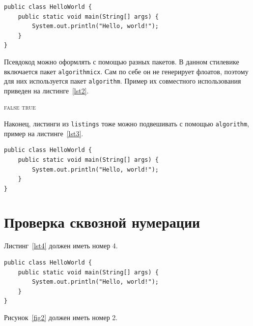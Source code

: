 \documentclass[specification,annotation,times]{itmo-student-thesis.cls}
\begin{document}
\begin{lstlisting}[float=!h,caption={Пример исходного кода на Java},label={lst1}]
public class HelloWorld {
    public static void main(String[] args) {
        System.out.println("Hello, world!");
    }
}
\end{lstlisting}

Псевдокод можно оформлять с помощью разных пакетов. В данном стилевике включается пакет \texttt{algorithmicx}.
Сам по себе он не генерирует флоатов, поэтому для них используется пакет \texttt{algorithm}.
Пример их совместного использования приведен на листинге~\ref{lst2}.

\begin{algorithm}[!h]
\caption{Пример псевдокода}\label{lst2}
\begin{algorithmic}
				\State\Return \textsc{false}
			\EndIf
		\EndFor
		\State\Return \textsc{true}
	\EndFunction
\end{algorithmic}
\end{algorithm}

Наконец, листинги из \texttt{listings} тоже можно подвешивать с помощью \texttt{algorithm},
пример на листинге~\ref{lst3}.

\begin{algorithm}[!h]
\caption{Исходный код и флоат \texttt{algorithm}}\label{lst3}
\begin{lstlisting}
public class HelloWorld {
    public static void main(String[] args) {
        System.out.println("Hello, world!");
    }
}
\end{lstlisting}
\end{algorithm}

\chapter{Проверка сквозной нумерации}

Листинг~\ref{lst4} должен иметь номер 4.

\begin{algorithm}[!h]
\caption{Исходный код и флоат \texttt{algorithm}}\label{lst4}
\begin{lstlisting}
public class HelloWorld {
    public static void main(String[] args) {
        System.out.println("Hello, world!");
    }
}
\end{lstlisting}
\end{algorithm}

Рисунок~\ref{fig2} должен иметь номер 2.
\end{document}

